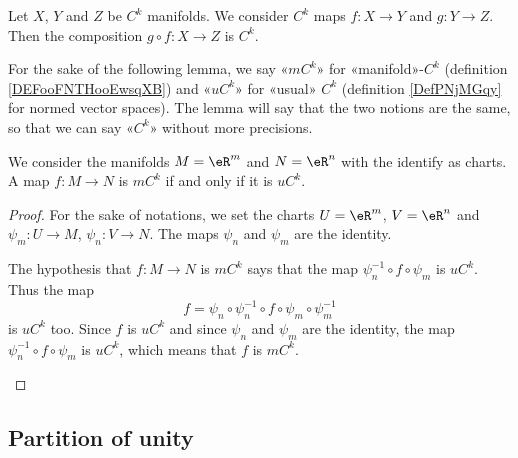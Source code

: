 \begin{proposition}		\label{PROPooODGHooFYluSu}
	Let \( X\), \( Y\) and \( Z\) be \( C^k\) manifolds. We consider \( C^k\) maps \(f \colon X\to Y  \) and \(g \colon Y\to Z  \). Then the composition \(g\circ f \colon X\to Z  \) is \( C^k\).
\end{proposition}

For the sake of the following lemma, we say «\( mC^k\)» for «manifold»-\( C^k\) (definition \ref{DEFooFNTHooEwsqXB}) and «\( uC^k\)» for «usual» \( C^k\) (definition \ref{DefPNjMGqy} for normed vector spaces). The lemma will say that the two notions are the same, so that we can say «\( C^k\)» without more precisions.
\begin{lemma}			\label{LEMooXGFXooBcmIbK}
	We consider the manifolds \( M=\eR^m\) and \( N=\eR^n\) with the identify as charts. A map \( f\colon M\to N\) is \( mC^k\) if and only if it is \( uC^k\).
\end{lemma}

\begin{proof}
	For the sake of notations, we set the charts \( U=\eR^m\), \( V=\eR^n\) and \( \psi_m\colon U\to M\), \( \psi_n\colon V\to N\). The maps \( \psi_n\) and \( \psi_m\) are the identity.
	\begin{subproof}
		\spitem[\( \Rightarrow\)]
		The hypothesis that \( f\colon M\to N\) is \( mC^k\) says that the map \( \psi_n^{-1}\circ f\circ\psi_m\) is \( uC^k\). Thus the map
		\begin{equation}
			f=\psi_n\circ\psi_n^{-1}\circ f\circ\psi_m\circ\psi_m^{-1}
		\end{equation}
		is \( uC^k\) too.
		\spitem[\( \Leftarrow\)]
		Since \( f\) is \( uC^k\) and since \( \psi_n\) and \( \psi_m\) are the identity, the map \( \psi_n^{-1}\circ f\circ\psi_m\) is \( uC^k\), which means that \( f\) is \( mC^k\).
	\end{subproof}
\end{proof}


\subsection{Partition of unity}

